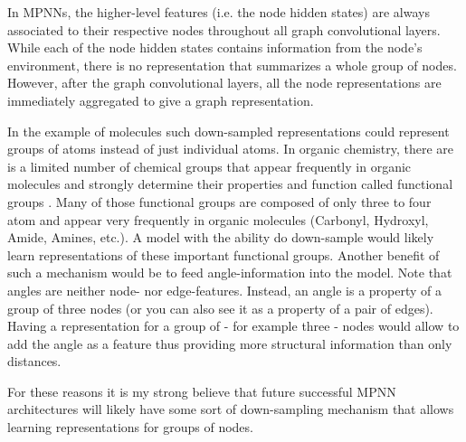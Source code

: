 In MPNNs, the higher-level features (i.e. the node hidden states) are always associated to their respective nodes throughout all graph convolutional layers. While each of the node hidden states contains information from the node's environment, there is no representation that summarizes a whole group of nodes. However, after the graph convolutional layers, all the node representations are immediately aggregated to give a graph representation.

In the example of molecules such down-sampled representations could represent groups of atoms instead of just individual atoms. In organic chemistry, there are is a limited number of chemical groups that appear frequently in organic molecules and strongly determine their properties and function called functional groups
. Many of those functional groups are composed of only three to four atom and appear very frequently in organic molecules (Carbonyl, Hydroxyl, Amide, Amines, etc.). A model with the ability do down-sample would likely learn representations of these important functional groups. Another benefit of such a mechanism would be to feed angle-information into the model. Note that angles are neither node- nor edge-features. Instead, an angle is a property of a group of three nodes (or you can also see it as a property of a pair of edges). Having a representation for a group of - for example three - nodes would allow to add the angle as a feature thus providing more structural information than only distances.

For these reasons it is my strong believe that future successful MPNN architectures will likely have some sort of down-sampling mechanism that allows learning representations for groups of nodes.


